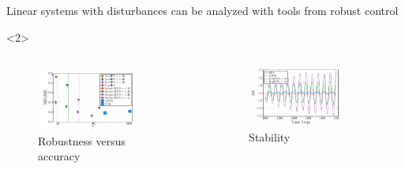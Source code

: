 \documentclass[8pt, t,
aspectratio=169,%
]{beamer}
\begin{document}
\begin{frame}{Linear systems with disturbances can be analyzed with tools from robust control}
\begin{onlyenv}
    \end{onlyenv}
    \begin{onlyenv}<2>
        \begin{columns}[T]
                \begin{figure}
                    \includegraphics[width=0.75\textwidth]{fig/rob_vs_acc.png}
                    \caption{Robustness versus accuracy \cite[Fig. 2]{revay2021recurrent}}
                \end{figure}
                \begin{figure}
                    \includegraphics[width=0.75\textwidth]{fig/perf.png}
                    \caption{Stability \cite[Fig. 5]{revay2021recurrent}}
                \end{figure}
        \end{columns}
    \end{onlyenv}
\end{frame}




\end{document}
